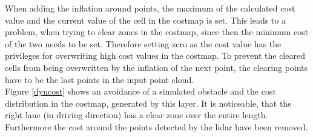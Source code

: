 When adding the inflation around points, the maximum of the calculated cost value and the current value of the cell in the costmap is set.
This leads to a problem, when trying to clear zones in the costmap, since then the minimum cost of the two needs to be set. Therefore setting zero as the cost value has the privileges for overwriting high cost values in the costmap.
 To prevent the cleared cells from being overwritten by the inflation of the next point, the clearing points have to be the last points in the input point cloud.\\

Figure \ref{dyncost} shows an avoidance of a simulated obstacle and the cost distribution in the costmap, generated by this layer. It is noticeable, that the right lane (in driving direction) has a clear zone over the entire length. Furthermore the cost around the points detected by the lidar have been removed.


